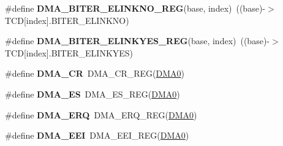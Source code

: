 \begin{DoxyCompactItemize}
\item 
\#define {\bfseries D\+M\+A\+\_\+\+B\+I\+T\+E\+R\+\_\+\+E\+L\+I\+N\+K\+N\+O\+\_\+\+R\+EG}(base,  index)~((base)-\/$>$T\+CD\mbox{[}index\mbox{]}.B\+I\+T\+E\+R\+\_\+\+E\+L\+I\+N\+K\+NO)\hypertarget{group__DMA__Register__Accessor__Macros_gaef38b025993510e86935a83451644087}{}\label{group__DMA__Register__Accessor__Macros_gaef38b025993510e86935a83451644087}

\item 
\#define {\bfseries D\+M\+A\+\_\+\+B\+I\+T\+E\+R\+\_\+\+E\+L\+I\+N\+K\+Y\+E\+S\+\_\+\+R\+EG}(base,  index)~((base)-\/$>$T\+CD\mbox{[}index\mbox{]}.B\+I\+T\+E\+R\+\_\+\+E\+L\+I\+N\+K\+Y\+ES)\hypertarget{group__DMA__Register__Accessor__Macros_ga06fd4f8696355df5a5562f1a9ab75d7b}{}\label{group__DMA__Register__Accessor__Macros_ga06fd4f8696355df5a5562f1a9ab75d7b}

\item 
\#define {\bfseries D\+M\+A\+\_\+\+CR}~D\+M\+A\+\_\+\+C\+R\+\_\+\+R\+EG(\hyperlink{group__DMA__Peripheral__Access__Layer_ga4103044f9ca209772f513dc694513ffb}{D\+M\+A0})\hypertarget{group__DMA__Register__Accessor__Macros_gacfc38bcb982272f5eaf2b00932f9a68e}{}\label{group__DMA__Register__Accessor__Macros_gacfc38bcb982272f5eaf2b00932f9a68e}

\item 
\#define {\bfseries D\+M\+A\+\_\+\+ES}~D\+M\+A\+\_\+\+E\+S\+\_\+\+R\+EG(\hyperlink{group__DMA__Peripheral__Access__Layer_ga4103044f9ca209772f513dc694513ffb}{D\+M\+A0})\hypertarget{group__DMA__Register__Accessor__Macros_ga20c45f5cf45e7046a88e8d2d8d495bd1}{}\label{group__DMA__Register__Accessor__Macros_ga20c45f5cf45e7046a88e8d2d8d495bd1}

\item 
\#define {\bfseries D\+M\+A\+\_\+\+E\+RQ}~D\+M\+A\+\_\+\+E\+R\+Q\+\_\+\+R\+EG(\hyperlink{group__DMA__Peripheral__Access__Layer_ga4103044f9ca209772f513dc694513ffb}{D\+M\+A0})\hypertarget{group__DMA__Register__Accessor__Macros_gabcd6dd657e5b4c8454d1b5caa49a99d6}{}\label{group__DMA__Register__Accessor__Macros_gabcd6dd657e5b4c8454d1b5caa49a99d6}

\item 
\#define {\bfseries D\+M\+A\+\_\+\+E\+EI}~D\+M\+A\+\_\+\+E\+E\+I\+\_\+\+R\+EG(\hyperlink{group__DMA__Peripheral__Access__Layer_ga4103044f9ca209772f513dc694513ffb}{D\+M\+A0})\hypertarget{group__DMA__Register__Accessor__Macros_gac3adc57a31ceb8782a86a5cc60176411}{}\label{group__DMA__Register__Accessor__Macros_gac3adc57a31ceb8782a86a5cc60176411}


\end{DoxyCompactItemize}
